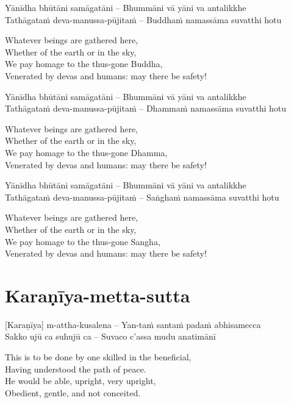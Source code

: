 Yānīdha bhūtāni samāgatāni – Bhummāni vā yāni va antalikkhe\\
Tathāgataṁ deva-manussa-pūjitaṁ – Buddhaṁ namassāma suvatthi hotu

\begin{english}
  Whatever beings are gathered here,\\
  Whether of the earth or in the sky,\\
  We pay homage to the thus-gone Buddha,\\
  Venerated by devas and humans: may there be safety!
\end{english}

Yānīdha bhūtāni samāgatāni – Bhummāni vā yāni va antalikkhe\\
Tathāgataṁ deva-manussa-pūjitaṁ – Dhammaṁ namassāma suvatthi hotu

\begin{english}
  Whatever beings are gathered here,\\
  Whether of the earth or in the sky,\\
  We pay homage to the thus-gone Dhamma,\\
  Venerated by devas and humans: may there be safety!
\end{english}

Yānīdha bhūtāni samāgatāni – Bhummāni vā yāni va antalikkhe\\
Tathāgataṁ deva-manussa-pūjitaṁ – Saṅghaṁ namassāma suvatthi hotu

\begin{english}
  Whatever beings are gathered here,\\
  Whether of the earth or in the sky,\\
  We pay homage to the thus-gone Sangha,\\
  Venerated by devas and humans: may there be safety!
\end{english}

\suttaRef{[Snp 2.1]}

\section{Karaṇīya-metta-sutta}
\label{karaniya-metta-sutta}
[Karaṇīya] m-attha-kusalena – Yan-taṁ santaṁ padaṁ abhisamecca\\
Sakko ujū ca suhujū ca – Suvaco c'assa mudu anatimānī

\begin{english}
  This is to be done by one skilled in the beneficial,\\
  Having understood the path of peace.\\
  He would be able, upright, very upright,\\
  Obedient, gentle, and not conceited.
\end{english}

